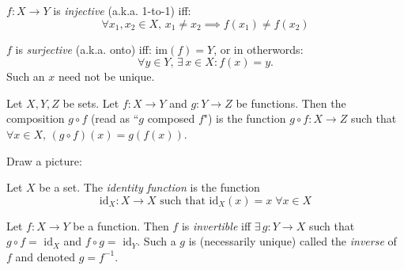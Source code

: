 \documentclass[10pt]{scrartcl}
\begin{document}
\begin{definition}
$f: X \to Y$ is \emph{injective} (a.k.a. 1-to-1) iff: 
\[\forall x_1,x_2 \in X,\, x_1 \neq x_2 \implies f(x_1) \neq f(x_2)\]	

$f$ is \emph{surjective} (a.k.a. onto) iff: im$(f) = Y$, or in otherwords: 
\[\forall y \in Y,\, \exists\,x \in X: f(x) = y.\]
Such an $x$ need not be unique. 	
\end{definition}\vspace*{10pt}


\begin{definition}
Let $X,Y,Z$ be sets. Let $f: X \to Y$ and $g: Y \to Z$ be functions. Then the composition $g \circ f$ (read as ``$g$ composed $f$") is the function $g \circ f: X\to Z$ such that $\forall x \in X,\, (g \circ f)(x) = g(f(x))$. 
\end{definition}

Draw a picture: 
\begin{center}
\end{center}

\begin{definition}
Let $X$ be a set. The \emph{identity function} is the function 
\[\text{id}_X: X \to X \text{ such that } \text{id}_X(x) = x\; \forall x \in X\]
\end{definition}\vspace*{5pt}

\begin{definition}
Let $f: X \to Y$ be a function. Then $f$ is \emph{invertible} iff $\exists\, g: Y \to X$ such that $g \circ f = \text{ id}_X$ and $f \circ g = \text{ id}_Y$. Such a $g$ is (necessarily unique) called the \emph{inverse} of $f$ and denoted $g = f^{-1}$. 
\end{definition}\vspace*{5pt}
\end{document}
